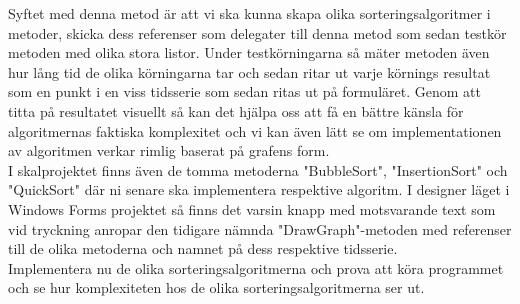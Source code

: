 \documentclass{article}
\begin{document}
Syftet med denna metod är att vi ska kunna skapa olika sorteringsalgoritmer i metoder, skicka dess referenser som delegater till denna metod som sedan testkör metoden med olika stora listor. Under testkörningarna så mäter metoden även hur lång tid de olika körningarna tar och sedan ritar ut varje körnings resultat som en punkt i en viss tidsserie som sedan ritas ut på formuläret. Genom att titta på resultatet visuellt så kan det hjälpa oss att få en bättre känsla för algoritmernas faktiska komplexitet och vi kan även lätt se om implementationen av algoritmen verkar rimlig baserat på grafens form.\\

I skalprojektet finns även de tomma metoderna "BubbleSort", "InsertionSort" och "QuickSort" där ni senare ska implementera respektive algoritm. I designer läget i Windows Forms projektet så finns det varsin knapp med motsvarande text som vid tryckning anropar den tidigare nämnda "DrawGraph"-metoden med referenser till de olika metoderna och namnet på dess respektive tidsserie.\\

Implementera nu de olika sorteringsalgoritmerna och prova att köra programmet och se hur komplexiteten hos de olika sorteringsalgoritmerna ser ut.\\


\end{document}
